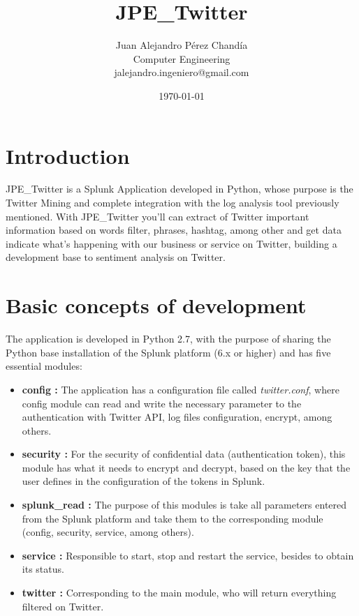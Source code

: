 \documentclass[report]{article}
\title{JPE\_Twitter} %
\author{%
    Juan Alejandro P\'erez Chand\'ia \\
    Computer Engineering\\
    jalejandro.ingeniero@gmail.com
}
\date{\today}
\begin{document}
\renewcommand*\contentsname{\color{skde}Contents}
\pagecolor{background}
\color{text}
\sloppy 


\addtocounter{page}{1}

\section{Introduction}
JPE\_Twitter is a Splunk Application developed in Python, whose purpose is the Twitter Mining and complete integration with the log analysis tool previously mentioned. With JPE\_Twitter you'll can extract of Twitter important information based on words filter, phrases, hashtag, among other and get data indicate what's happening with our business or service on Twitter, building a development base to sentiment analysis on Twitter.
\newpage
\tableofcontents
\thispagestyle{empty}

\newpage
\section{Basic concepts of development}

The application is developed in Python 2.7, with the purpose of sharing the Python base installation of the Splunk platform (6.x or higher) and has five essential modules:
\newline
\begin{itemize}
\item {\bf config :} The application has a configuration file called \textit{twitter.conf}, where config module can read and write the necessary parameter to the authentication with Twitter API, log files configuration, encrypt, among others.

\item {\bf security :} For the security of confidential data (authentication token), this module has what it needs to encrypt and decrypt, based on the key that the user defines in the configuration of the tokens in Splunk.

\item {\bf splunk\_read :} The purpose of this modules is take all parameters entered from the Splunk platform and take them to the corresponding module (config, security, service, among others).

\item {\bf service :} Responsible to start, stop and restart the service, besides to obtain its status.

\item {\bf twitter :} Corresponding to the main module, who will return everything filtered on Twitter.
\newline
\end{itemize}
\end{document}
